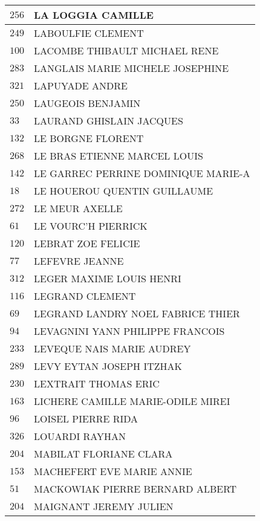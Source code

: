 \begin{xltabular}{\linewidth}{|l|X|}
    \hline
    $256$ & LA LOGGIA CAMILLE \\
    \hline
    $249$ & LABOULFIE CLEMENT \\
    \hline
    $100$ & LACOMBE THIBAULT MICHAEL RENE \\
    \hline
    $283$ & LANGLAIS MARIE MICHELE JOSEPHINE \\
    \hline
    $321$ & LAPUYADE ANDRE \\
    \hline
    $250$ & LAUGEOIS BENJAMIN \\
    \hline
    $33$ & LAURAND GHISLAIN JACQUES \\
    \hline
    $132$ & LE BORGNE FLORENT \\
    \hline
    $268$ & LE BRAS ETIENNE MARCEL LOUIS \\
    \hline
    $142$ & LE GARREC PERRINE DOMINIQUE MARIE-A \\
    \hline
    $18$ & LE HOUEROU QUENTIN GUILLAUME \\
    \hline
    $272$ & LE MEUR AXELLE \\
    \hline
    $61$ & LE VOURC'H PIERRICK \\
    \hline
    $120$ & LEBRAT ZOE FELICIE \\
    \hline
    $77$ & LEFEVRE JEANNE \\
    \hline
    $312$ & LEGER MAXIME LOUIS HENRI \\
    \hline
    $116$ & LEGRAND CLEMENT \\
    \hline
    $69$ & LEGRAND LANDRY NOEL FABRICE THIER \\
    \hline
    $94$ & LEVAGNINI YANN PHILIPPE FRANCOIS \\
    \hline
    $233$ & LEVEQUE NAIS MARIE AUDREY \\
    \hline
    $289$ & LEVY EYTAN JOSEPH ITZHAK \\
    \hline
    $230$ & LEXTRAIT THOMAS ERIC \\
    \hline
    $163$ & LICHERE CAMILLE MARIE-ODILE MIREI \\
    \hline
    $96$ & LOISEL PIERRE RIDA \\
    \hline
    $326$ & LOUARDI RAYHAN \\
    \hline
    $204$ & MABILAT FLORIANE CLARA \\
    \hline
    $153$ & MACHEFERT EVE MARIE ANNIE \\
    \hline
    $51$ & MACKOWIAK PIERRE BERNARD ALBERT \\
    \hline
    $204$ & MAIGNANT JEREMY JULIEN \\
    \hline

\end{xltabular}
